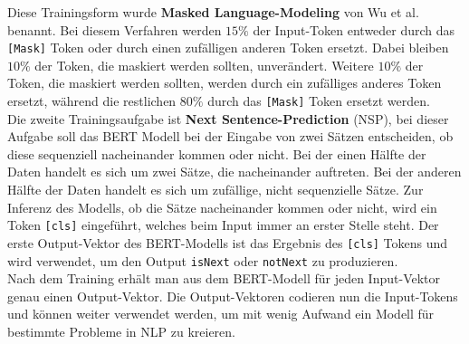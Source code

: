 \documentclass[12pt,letterpaper,ngerman]{article}
\begin{document}
Diese Trainingsform wurde {\bf Masked Language-Modeling} von 
Wu et al. benannt.
Bei diesem Verfahren werden $15 \%$ der Input-Token entweder durch das
\verb|[Mask]| Token oder durch einen zufälligen anderen Token ersetzt.
Dabei bleiben $10 \%$ der Token, die maskiert werden sollten,
unverändert. Weitere $10 \%$ der Token, die maskiert werden sollten,
werden durch ein zufälliges anderes Token ersetzt, während die
restlichen $80 \%$ durch das \verb|[Mask]| Token ersetzt werden.\\
Die zweite Trainingsaufgabe ist {\bf Next Sentence-Prediction} (NSP),
bei dieser Aufgabe soll das BERT Modell bei der Eingabe von zwei Sätzen 
entscheiden, ob diese sequenziell nacheinander kommen oder nicht.
Bei der einen Hälfte der Daten handelt es sich um zwei Sätze, die nacheinander 
auftreten. Bei der anderen Hälfte der Daten handelt es sich um zufällige,
nicht sequenzielle Sätze. Zur Inferenz des Modells, ob die Sätze
nacheinander kommen oder nicht, wird ein Token \verb|[cls]| 
eingeführt, welches beim Input immer an erster Stelle steht.
Der erste Output-Vektor des BERT-Modells ist das Ergebnis des
\verb|[cls]| Tokens und wird verwendet, um den Output
\verb|isNext| oder \verb|notNext| zu produzieren.\\
Nach dem Training erhält man aus dem BERT-Modell für jeden 
Input-Vektor genau einen Output-Vektor. Die Output-Vektoren 
codieren nun die Input-Tokens und können weiter verwendet werden,
um mit wenig Aufwand ein Modell für bestimmte Probleme in NLP zu 
kreieren.\\
\end{document}
